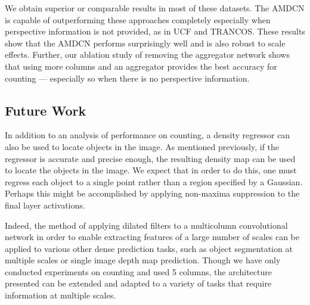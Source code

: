 \documentclass[10pt,twocolumn,letterpaper]{article}
\begin{document}
We obtain superior or comparable results in most of these datasets. The AMDCN is capable of outperforming these approaches completely especially when perspective information is not provided, as in UCF and TRANCOS. These results show that the AMDCN performs surprisingly well and is also robust to scale effects. Further, our ablation study of removing the aggregator network shows that using more columns and an aggregator provides the best accuracy for counting --- especially so when there is no perspective information.

\subsection{Future Work}

In addition to an analysis of performance on counting, a density regressor can also be used to locate objects in the image. As mentioned previously, if the regressor is accurate and precise enough, the resulting density map can be used to locate the objects in the image. We expect that in order to do this, one must regress each object to a single point rather than a region specified by a Gaussian. Perhaps this might be accomplished by applying non-maxima suppression to the final layer activations.

Indeed, the method of applying dilated filters to a multicolumn convolutional network in order to enable extracting features of a large number of scales can be applied to various other dense prediction tasks, such as object segmentation at multiple scales or single image depth map prediction. Though we have only conducted experiments on counting and used 5 columns, the architecture presented can be extended and adapted to a variety of tasks that require information at multiple scales.



%
\end{document}
